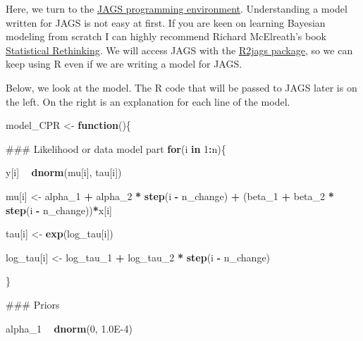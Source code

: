 \documentclass[]{article}
\newenvironment{Shaded}{\begin{snugshade}}{\end{snugshade}}
\newcommand{\KeywordTok}[1]{\textcolor[rgb]{0.13,0.29,0.53}{\textbf{#1}}}
\newcommand{\DecValTok}[1]{\textcolor[rgb]{0.00,0.00,0.81}{#1}}
\newcommand{\FloatTok}[1]{\textcolor[rgb]{0.00,0.00,0.81}{#1}}
\newcommand{\StringTok}[1]{\textcolor[rgb]{0.31,0.60,0.02}{#1}}
\newcommand{\ControlFlowTok}[1]{\textcolor[rgb]{0.13,0.29,0.53}{\textbf{#1}}}
\newcommand{\OperatorTok}[1]{\textcolor[rgb]{0.81,0.36,0.00}{\textbf{#1}}}
\newcommand{\NormalTok}[1]{#1}
\begin{document}
Here, we turn to the \href{https://mcmc-jags.sourceforge.io/}{JAGS
programming environment}. Understanding a model written for JAGS is not
easy at first. If you are keen on learning Bayesian modeling from
scratch I can highly recommend Richard McElreath's book
\href{https://xcelab.net/rm/statistical-rethinking/}{Statistical
Rethinking}. We will access JAGS with the
\href{https://CRAN.R-project.org/package=R2jags}{R2jags package}, so we
can keep using R even if we are writing a model for JAGS.

Below, we look at the model. The R code that will be passed to JAGS
later is on the left. On the right is an explanation for each line of
the model.

\begin{Shaded}
\begin{Highlighting}[]
\NormalTok{model_CPR <-}\StringTok{ }\ControlFlowTok{function}\NormalTok{()\{}
  
\NormalTok{  ### Likelihood or data model part}
  \ControlFlowTok{for}\NormalTok{(i }\ControlFlowTok{in} \DecValTok{1}\OperatorTok{:}\NormalTok{n)\{}
    
\NormalTok{  y[i] }\OperatorTok{~}\StringTok{ }\KeywordTok{dnorm}\NormalTok{(mu[i], tau[i]) }

    
    
\NormalTok{  mu[i] <-}\StringTok{ }\NormalTok{alpha_}\DecValTok{1} \OperatorTok{+}\StringTok{ }
\StringTok{  }\NormalTok{alpha_}\DecValTok{2} \OperatorTok{*}\StringTok{ }\KeywordTok{step}\NormalTok{(i }\OperatorTok{-}\StringTok{ }\NormalTok{n_change) }\OperatorTok{+}
\StringTok{  }\NormalTok{(beta_}\DecValTok{1} \OperatorTok{+}\StringTok{ }\NormalTok{beta_}\DecValTok{2} \OperatorTok{*}\StringTok{ }\KeywordTok{step}\NormalTok{(i }\OperatorTok{-}\StringTok{ }\NormalTok{n_change))}\OperatorTok{*}\NormalTok{x[i]}
  
  
  
\NormalTok{  tau[i] <-}\StringTok{ }\KeywordTok{exp}\NormalTok{(log_tau[i])}
  
\NormalTok{  log_tau[i] <-}\StringTok{ }\NormalTok{log_tau_}\DecValTok{1} \OperatorTok{+}\StringTok{ }\NormalTok{log_tau_}\DecValTok{2} \OperatorTok{*}\StringTok{ }
\StringTok{  }\KeywordTok{step}\NormalTok{(i }\OperatorTok{-}\StringTok{ }\NormalTok{n_change)}
  
\NormalTok{  \} }
  
\NormalTok{  ### Priors}
  
  
\NormalTok{  alpha_}\DecValTok{1} \OperatorTok{~}\StringTok{ }\KeywordTok{dnorm}\NormalTok{(}\DecValTok{0}\NormalTok{, }\FloatTok{1.0E-4}\NormalTok{)}
  

\end{Highlighting}
\end{Shaded}
\end{document}

